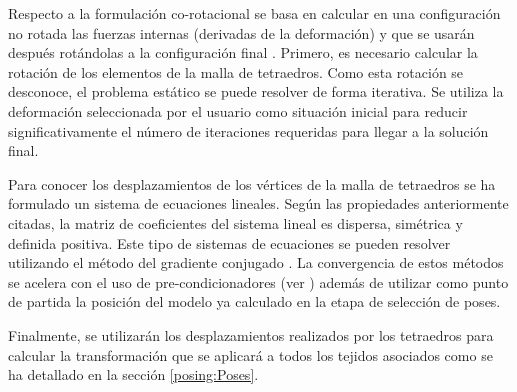 

Respecto a la formulación co-rotacional se basa en calcular en una configuración no rotada las fuerzas internas (derivadas de la deformación) y que se usarán después rotándolas a la configuración final \cite{Muller2004}. Primero, es necesario calcular la rotación de los elementos de la malla de tetraedros. Como esta rotación se desconoce, el problema estático se puede resolver de forma iterativa. Se utiliza la deformación seleccionada por el usuario como situación inicial para reducir significativamente el número de iteraciones requeridas para llegar a la solución final.  %

Para conocer los desplazamientos de los vértices de la malla de tetraedros se ha formulado un sistema de ecuaciones lineales. Según las propiedades anteriormente citadas, la matriz de coeficientes del sistema lineal es dispersa, simétrica y definida positiva. Este tipo de sistemas de ecuaciones se pueden resolver utilizando el método del gradiente conjugado \cite{Press2007}. La convergencia de estos métodos se acelera con el uso de pre-condicionadores (ver \cite{hauth2003}) además de utilizar como punto de partida la posición del modelo ya calculado en la etapa de selección de poses. %

Finalmente, se utilizarán los desplazamientos realizados por los tetraedros para calcular la transformación que se aplicará a todos los tejidos asociados como se ha detallado en la sección \ref{posing:Poses}.%



